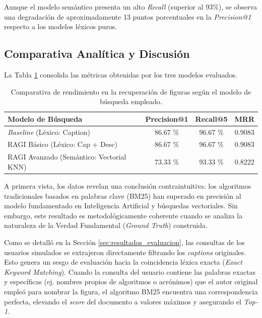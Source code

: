 \documentclass[../main.tex]{subfiles}
\begin{document}
Aunque el modelo semántico presenta un alto \textit{Recall} (superior al 93\%), se observa una degradación de aproximadamente 13 puntos porcentuales en la \textit{Precision@1} respecto a los modelos léxicos puros.

\subsection{Comparativa Analítica y Discusión}
La Tabla \ref{tab:resultados_cuantitativos} consolida las métricas obtenidas por los tres modelos evaluados.

\begin{table}[H]
    \centering
    \begin{tabular}{|l|c|c|c|}
        \hline
        \textbf{Modelo de Búsqueda} & \textbf{Precision@1} & \textbf{Recall@5} & \textbf{MRR} \\ \hline
        \textit{Baseline} (Léxico: Caption) & 86.67 \% & 96.67 \% & 0.9083 \\ \hline
        RAGI Básico (Léxico: Cap + Desc) & 86.67 \% & 96.67 \% & 0.9083 \\ \hline
        RAGI Avanzado (Semántico: Vectorial KNN) & 73.33 \% & 93.33 \% & 0.8222 \\ \hline
    \end{tabular}
    \caption{Comparativa de rendimiento en la recuperación de figuras según el modelo de búsqueda empleado.}
    \label{tab:resultados_cuantitativos}
\end{table}

A primera vista, los datos revelan una conclusión contraintuitiva: los algoritmos tradicionales basados en palabras clave (BM25) han superado en precisión al modelo fundamentado en Inteligencia Artificial y búsquedas vectoriales. Sin embargo, este resultado es metodológicamente coherente cuando se analiza la naturaleza de la Verdad Fundamental (\textit{Ground Truth}) construida.

Como se detalló en la Sección \ref{sec:resultados_evaluacion}, las consultas de los usuarios simulados se extrajeron directamente filtrando los \textit{captions} originales. Esto genera un sesgo de evaluación hacia la coincidencia léxica exacta (\textit{Exact Keyword Matching}). Cuando la consulta del usuario contiene las palabras exactas y específicas (ej. nombres propios de algoritmos o acrónimos) que el autor original empleó para nombrar la figura, el algoritmo BM25 encuentra una correspondencia perfecta, elevando el \textit{score} del documento a valores máximos y asegurando el \textit{Top-1}.
\end{document}
